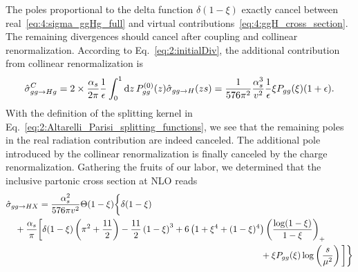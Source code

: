 The poles proportional to the delta function $\delta (1 - \xi)$ exactly cancel between real~\eqref{eq:4:sigma_ggHg_full} and virtual contributions~\eqref{eq:4:ggH_cross_section}. The remaining divergences should cancel after coupling and collinear renormalization. According to Eq.~\eqref{eq:2:initialDiv}, the additional contribution from collinear renormalization is
\begin{equation}
\hat{\sigma}_{gg \rightarrow Hg}^C = 2 \times \frac{\alpha_s}{2 \pi} \frac{1}{\epsilon} \int_0^1 \mathrm{d} z\, P_{gg}^{(0)}(z) \hat{\sigma}_{gg \rightarrow H} (z s) = \frac{1}{576 \pi^2} \frac{\alpha_s^3}{v^2} \frac{1}{\epsilon} \xi P_{gg}(\xi) (1 + \epsilon).
\end{equation}
With the definition of the splitting kernel in Eq.~\eqref{eq:2:Altarelli_Parisi_splitting_functions}, we see that the remaining poles in the real radiation contribution are indeed canceled. The additional pole introduced by the collinear renormalization is finally canceled by the charge renormalization. Gathering the fruits of our labor, we determined that the inclusive partonic cross section at \acs{NLO} reads
\begin{equation}
\begin{split}
& \hat{\sigma}_{gg \rightarrow HX} = \frac{\alphas^2}{576 \pi v^2} \Theta(1 - \xi) \bigg \lbrace \delta(1 - \xi) \\
& \quad + \frac{\alphas}{\pi} \bigg [ \delta(1 - \xi) \left(\pi^2 + \frac{11}{2} \right) - \frac{11}{2} \left(1 - \xi \right)^3 + 6 \left( 1 + \xi^4 + (1 - \xi)^4 \right) \left(\frac{\log (1 - \xi)}{1 - \xi} \right)_+ \\
& \hspace{10cm} + \xi P_{gg}(\xi) \log \left(\frac{s}{\mu^2} \right) \bigg ] \bigg \rbrace
\end{split}
\label{eq:4:ggHX_NLO_HTL_cross_section}
\end{equation}


